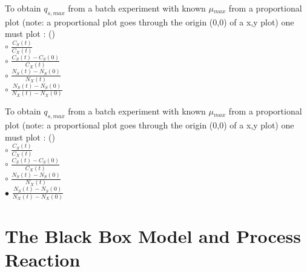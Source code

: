 \documentclass[]{beamer}
\begin{document}
\begin{frame}[shrink] {}
\color{blue}

To obtain $q_{s,max}$ from a batch experiment with known $\mu$$_{max}$ from a proportional plot (note: a proportional plot goes through the origin (0,0) of a x,y plot) one must plot :  ({\color{green}{Q11}})\\[0.5em]
\color{black}
\setlength{\parindent}{-0.4cm}
{\color{red}$\circ$} $\frac{C_S(t)}{C_X(t)}$  \\[0.3em]
{\color{red}$\circ$} $\frac{C_S(t)-C_S(0)}{C_X(t)}$  \\[0.3em]
{\color{red}$\circ$} $\frac{N_S(t)-N_S(0)}{N_X(t)}$  \\[0.3em]
{\color{red}$\circ$} $\frac{N_S(t)-N_S(0)}{N_X(t)-N_X(0)}$  \\[0.3em]
\end{frame}
\begin{frame}[shrink] {}
\color{blue}

To obtain $q_{s,max}$ from a batch experiment with known $\mu$$_{max}$ from a proportional plot (note: a proportional plot goes through the origin (0,0) of a x,y plot) one must plot :  ({\color{green}{Q11}})\\[0.5em]
\color{black}
\setlength{\parindent}{-0.4cm}
{\color{red}$\circ$} $\frac{C_S(t)}{C_X(t)}$  \\[0.3em]
{\color{red}$\circ$} $\frac{C_S(t)-C_S(0)}{C_X(t)}$  \\[0.3em]
{\color{red}$\circ$} $\frac{N_S(t)-N_S(0)}{N_X(t)}$  \\[0.3em]
{\color{red}$\bullet$} $\frac{N_S(t)-N_S(0)}{N_X(t)-N_X(0)}$  \\[0.3em]
\end{frame}


\section{The Black Box Model and Process Reaction}
\end{document}

